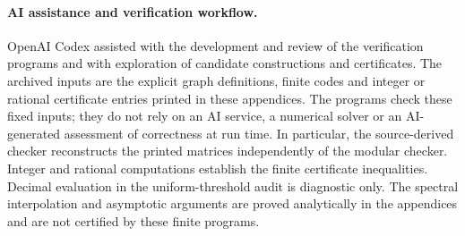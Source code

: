 \paragraph{AI assistance and verification workflow.}
OpenAI Codex assisted with the development and review of the verification
programs and with exploration of candidate constructions and certificates.
The archived inputs are the explicit graph definitions, finite codes and
integer or rational certificate entries printed in these appendices.
The programs check these fixed inputs; they do not rely on an AI service,
a numerical solver or an AI-generated assessment of correctness at run time.
In particular, the source-derived checker reconstructs the printed matrices
independently of the modular checker. Integer and rational computations
establish the finite certificate inequalities. Decimal evaluation in the
uniform-threshold audit is diagnostic only. The spectral interpolation
and asymptotic arguments are proved analytically in the appendices and
are not certified by these finite programs.
